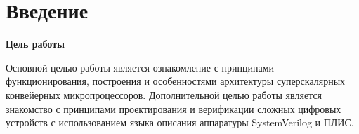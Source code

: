 \tableofcontents
\clearpage

\chapter{Введение}


\textbf{Цель работы}\newline

Основной целью работы является ознакомление с принципами функционирования,
построения и особенностями архитектуры суперскалярных конвейерных микропроцессоров.
Дополнительной целью работы является знакомство с принципами проектирования и
верификации сложных цифровых устройств с использованием языка описания аппаратуры
SystemVerilog и ПЛИС.
